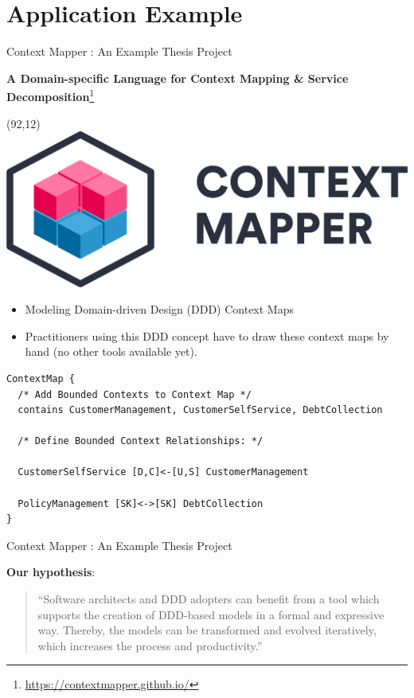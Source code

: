 \documentclass[10pt]{beamer}
\begin{document}
\section{Application Example}


\begin{frame}[fragile]{Context Mapper \cite{contextmapper}: An Example Thesis Project}
	
	\textbf{A Domain-specific Language for Context Mapping \linebreak \& Service Decomposition}\footnote{\url{https://contextmapper.github.io/}}
	
	\begin{textblock}{20}(92,12)
		\includegraphics[scale=0.05]{./images/cm.png}
    \end{textblock}	
	
	\begin{itemize}
		\item Modeling Domain-driven Design (DDD) Context Maps
		\item Practitioners using this DDD concept have to draw these context maps by hand (no other tools available yet).
	\end{itemize}
	
\begin{verbatim}
ContextMap {
  /* Add Bounded Contexts to Context Map */
  contains CustomerManagement, CustomerSelfService, DebtCollection
  
  /* Define Bounded Context Relationships: */
  
  CustomerSelfService [D,C]<-[U,S] CustomerManagement
  
  PolicyManagement [SK]<->[SK] DebtCollection
}
\end{verbatim}

\end{frame}

\begin{frame}{Context Mapper \cite{contextmapper}: An Example Thesis Project}
	
	\textbf{Our hypothesis}:
	\begin{quotation}
		``Software architects and DDD adopters can benefit from a tool which supports the creation of DDD-based models in a formal and expressive way. Thereby, the models can be transformed and evolved iteratively, which increases the process and productivity.''
	\end{quotation}	
	
\end{frame}
\end{document}
